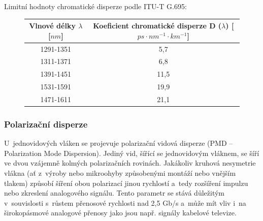 Limitní hodnoty chromatické disperze podle ITU-T G.695:

\begin{figure}[ht]
  \centering
  \begin{tabular}{cc}
    \toprule
    Vlnové délky \(\lambda\) {[}\(nm\){]} & Koeficient chromatické disperze D (\(\lambda\)) {[}\(ps \cdot nm^{-1} \cdot km^{-1}\){]} \\
    \midrule
    1291-1351                             & 5,7                                                                                      \\
    \midrule
    1311-1371                             & 6,8                                                                                      \\
    \midrule
    1391-1451                             & 11,5                                                                                     \\
    \midrule
    1531-1591                             & 19,9                                                                                     \\
    \midrule
    1471-1611                             & 21,1                                                                                     \\
    \bottomrule
  \end{tabular}
\end{figure}

\subsubsection{Polarizační disperze}
U~jednovidových vláken se projevuje polarizační vidová disperze (PMD -- Polarization Mode Dispersion). Jediný vid, šířící se jednovidovým vláknem, se šíří ve dvou vzájemně kolmých polarizačních rovinách. Jakákoliv kruhová nesymetrie vlákna (ať z~výroby nebo mikroohyby způsobenými montáží nebo vnějším tlakem) způsobí šíření obou polarizací jinou rychlostí a~tedy rozšíření impulzu nebo zkreslení analogového signálu. Tento parametr se stává důležitým v~souvislosti s~růstem přenosové rychlosti nad 2,5 Gb/s a~může mít vliv i~na širokopásmové analogové přenosy jako jsou např. signály kabelové televize.

